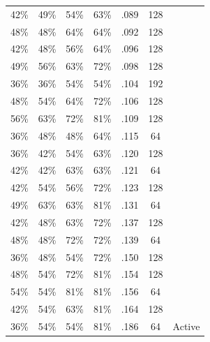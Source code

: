\documentclass[
  man,mask]{apa7}
\newenvironment{lltable}{\begin{landscape}\centering\begin{ThreePartTable}}{\end{ThreePartTable}\end{landscape}}
\begin{document}
\begin{lltable}
{\begin{longtable}{ccccccc}
42\% & 49\% & 54\% & 63\% & .089 & 128 & \\
48\% & 48\% & 64\% & 64\% & .092 & 128 & \\
42\% & 48\% & 56\% & 64\% & .096 & 128 & \\
49\% & 56\% & 63\% & 72\% & .098 & 128 & \\
36\% & 36\% & 54\% & 54\% & .104 & 192 & \\
48\% & 54\% & 64\% & 72\% & .106 & 128 & \\
56\% & 63\% & 72\% & 81\% & .109 & 128 & \\
36\% & 48\% & 48\% & 64\% & .115 & 64 & \\
36\% & 42\% & 54\% & 63\% & .120 & 128 & \\
42\% & 42\% & 63\% & 63\% & .121 & 64 & \\
42\% & 54\% & 56\% & 72\% & .123 & 128 & \\
49\% & 63\% & 63\% & 81\% & .131 & 64 & \\
42\% & 48\% & 63\% & 72\% & .137 & 128 & \\
48\% & 48\% & 72\% & 72\% & .139 & 64 & \\
36\% & 48\% & 54\% & 72\% & .150 & 128 & \\
48\% & 54\% & 72\% & 81\% & .154 & 128 & \\
54\% & 54\% & 81\% & 81\% & .156 & 64 & \\
42\% & 54\% & 63\% & 81\% & .164 & 128 & \\
36\% & 54\% & 54\% & 81\% & .186 & 64 & Active\\
\bottomrule
\end{longtable}

}

\end{lltable}
\end{document}
